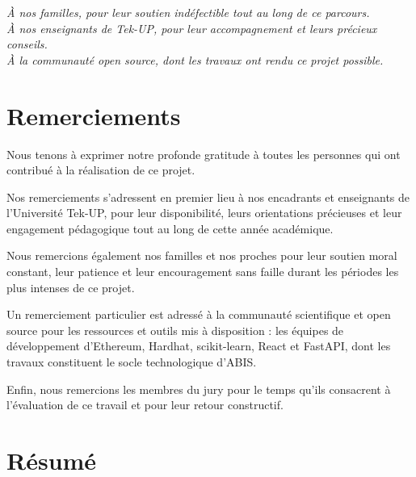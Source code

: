 \documentclass[12pt,a4paper]{report}
\begin{document}
\newpage
\thispagestyle{empty}
\vspace*{5cm}
\begin{flushright}
\begin{minipage}{0.6\linewidth}
\itshape
\textit{À nos familles, pour leur soutien indéfectible tout au long de ce parcours.}\\[0.5cm]
\textit{À nos enseignants de Tek-UP, pour leur accompagnement et leurs précieux conseils.}\\[0.5cm]
\textit{À la communauté open source, dont les travaux ont rendu ce projet possible.}
\end{minipage}
\end{flushright}

\newpage
\chapter*{Remerciements}

Nous tenons à exprimer notre profonde gratitude à toutes les personnes qui ont contribué à la réalisation de ce projet.

Nos remerciements s'adressent en premier lieu à nos encadrants et enseignants de l'Université Tek-UP, pour leur disponibilité, leurs orientations précieuses et leur engagement pédagogique tout au long de cette année académique.

Nous remercions également nos familles et nos proches pour leur soutien moral constant, leur patience et leur encouragement sans faille durant les périodes les plus intenses de ce projet.

Un remerciement particulier est adressé à la communauté scientifique et open source pour les ressources et outils mis à disposition : les équipes de développement d'Ethereum, Hardhat, scikit-learn, React et FastAPI, dont les travaux constituent le socle technologique d'ABIS.

Enfin, nous remercions les membres du jury pour le temps qu'ils consacrent à l'évaluation de ce travail et pour leur retour constructif.

\newpage
\chapter*{Résumé}
\end{document}
